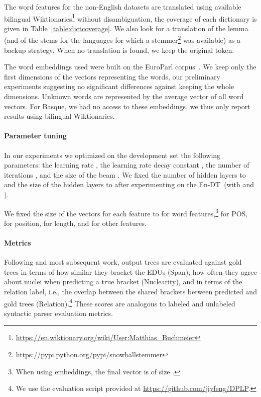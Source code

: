 \documentclass[11pt]{article}
\newcommand{\erstdt}{En-DT}
\begin{document}
The word features for the non-English datasets are translated using available bilingual Wiktionaries\footnote{\url{https://en.wiktionary.org/wiki/User:Matthias_Buchmeier}} without disambiguation, the coverage of each dictionary is given in Table~\ref{table:dictcoverage}.
We also look for a translation of the lemma (and of the stems for the languages for which a stemmer\footnote{\url{https://pypi.python.org/pypi/snowballstemmer}} was available) as a backup strategy. 
When no translation is found, we keep the original token.

The word embeddings used were built on the EuroParl corpus~\cite{levy:strong:2017}. We keep only the  first dimensions of the vectors representing the words, our preliminary experiments suggesting no significant differences against keeping the whole  dimensions.
Unknown words are represented by the average vector of all word vectors.
For Basque, we had no access to these embeddings, we thus only report results using bilingual Wiktionaries.


\paragraph{Parameter tuning}
In our experiments we optimized on the development set the following parameters: the learning rate , the learning rate decay constant , the number of iterations , and the size of the beam . We fixed the number  of hidden layers to  and the size of the hidden layers  to  after experimenting on the \erstdt\ (with  and ).

We fixed the size of the vectors for each feature to  for word features,\footnote{When using embeddings, the final vector is of size .}  for POS,  for position,  for length, and  for other features.

\paragraph{Metrics}

Following \cite{marcu:theory:2000} and most subsequent work, output trees are evaluated against gold trees in terms of how similar they bracket the EDUs (Span), how often they agree about nuclei when predicting a true bracket (Nuclearity), and in terms of the relation label, i.e., the overlap between the shared brackets between predicted and gold trees (Relation).\footnote{We use the evaluation script provided at \url{https://github.com/jiyfeng/DPLP}.} These scores are analogous to labeled and unlabeled syntactic parser evaluation metrics. 
\end{document}
